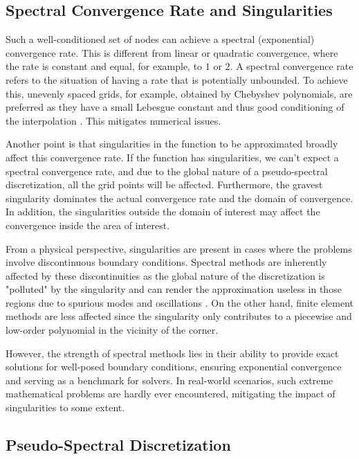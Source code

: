 \subsection{Spectral Convergence Rate and Singularities}

Such a well-conditioned set of nodes can achieve a spectral (exponential)
convergence rate. This is different from linear or quadratic convergence, where
the rate is constant and equal, for example, to $1$ or $2$. A spectral
convergence rate refers to the situation of having a rate that is potentially
unbounded. To achieve this, unevenly spaced grids, for example, obtained by
Chebyshev polynomials, are preferred as they have a small Lebesgue constant and
thus good conditioning of the interpolation \citep{meseguer2020}. This
mitigates numerical issues.

Another point is that singularities in the function to be approximated broadly
affect this convergence rate. If the function has singularities, we can't
expect a spectral convergence rate, and due to the global nature of a
pseudo-spectral discretization, all the grid points will be affected.
Furthermore, the gravest singularity dominates the actual convergence rate and
the domain of convergence. In addition, the singularities outside the domain of
interest may affect the convergence inside the area of interest. 

From a physical perspective, singularities are present in cases where the
problems involve discontinuous boundary conditions. Spectral methods are
inherently affected by these discontinuities as the global nature of the
discretization is "polluted" by the singularity and can render the
approximation useless in those regions due to spurious modes and oscillations
\citep{canuto2006}. On the other hand, finite element methods are less affected
since the singularity only contributes to a piecewise and low-order polynomial
in the vicinity of the corner.

However, the strength of spectral methods lies in their ability to provide
exact solutions for well-posed boundary conditions, ensuring exponential
convergence and serving as a benchmark for solvers. In real-world scenarios,
such extreme mathematical problems are hardly ever encountered, mitigating the
impact of singularities to some extent.

\subsection{Pseudo-Spectral Discretization}

